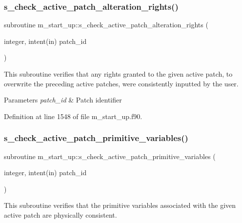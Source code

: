 \subsubsection{\texorpdfstring{s\+\_\+check\+\_\+active\+\_\+patch\+\_\+alteration\+\_\+rights()}{s\_check\_active\_patch\_alteration\_rights()}}
{\footnotesize\ttfamily subroutine m\+\_\+start\+\_\+up\+::s\+\_\+check\+\_\+active\+\_\+patch\+\_\+alteration\+\_\+rights (\begin{DoxyParamCaption}\item[{integer, intent(in)}]{patch\+\_\+id }\end{DoxyParamCaption})}



This subroutine verifies that any rights granted to the given active patch, to overwrite the preceding active patches, were consistently inputted by the user. 


\begin{DoxyParams}{Parameters}
{\em patch\+\_\+id} & Patch identifier \\
\hline
\end{DoxyParams}


Definition at line 1548 of file m\+\_\+start\+\_\+up.\+f90.

\mbox{\label{namespacem__start__up_a2650f87062992def80eb084ff2c0913b}} 
\subsubsection{\texorpdfstring{s\+\_\+check\+\_\+active\+\_\+patch\+\_\+primitive\+\_\+variables()}{s\_check\_active\_patch\_primitive\_variables()}}
{\footnotesize\ttfamily subroutine m\+\_\+start\+\_\+up\+::s\+\_\+check\+\_\+active\+\_\+patch\+\_\+primitive\+\_\+variables (\begin{DoxyParamCaption}\item[{integer, intent(in)}]{patch\+\_\+id }\end{DoxyParamCaption})}



This subroutine verifies that the primitive variables associated with the given active patch are physically consistent. 


